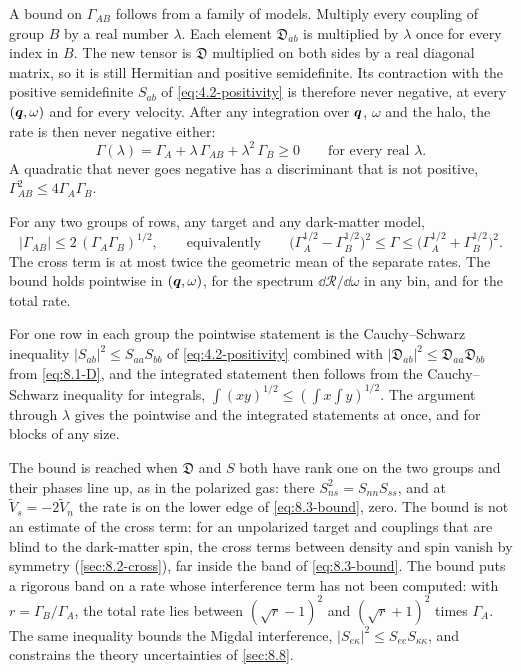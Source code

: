 A bound on $\varGamma_{AB}$ follows from a family of models. Multiply every coupling of group $B$ by a real number $\lambda$. Each element $\mathfrak{D}_{ab}$ is multiplied by $\lambda$ once for every index in $B$. The new tensor is $\mathfrak{D}$ multiplied on both sides by a real diagonal matrix, so it is still Hermitian and positive semidefinite. Its contraction with the positive semidefinite $S_{ab}$ of \cref{eq:4.2-positivity} is therefore never negative, at every $(\bm{q},\omega)$ and for every velocity. After any integration over $\bm{q}$, $\omega$ and the halo, the rate is then never negative either:
\begin{equation*}
  \varGamma(\lambda) = \varGamma_A + \lambda\,\varGamma_{AB} + \lambda^2\,\varGamma_B \ge 0 \qquad \text{for every real } \lambda .
\end{equation*}
A quadratic that never goes negative has a discriminant that is not positive, $\varGamma_{AB}^2 \le 4\varGamma_A\varGamma_B$.
\begin{keyresult}
For any two groups of rows, any target and any dark-matter model,
\begin{equation}
  |\varGamma_{AB}| \le 2\,(\varGamma_A\varGamma_B)^{1/2} , \qquad\text{equivalently}\qquad
  \bigl(\varGamma_A^{1/2} - \varGamma_B^{1/2}\bigr)^2 \le \varGamma \le \bigl(\varGamma_A^{1/2} + \varGamma_B^{1/2}\bigr)^2 .
  \label{eq:8.3-bound}
\end{equation}
The cross term is at most twice the geometric mean of the separate rates. The bound holds pointwise in $(\bm{q},\omega)$, for the spectrum $\dd\mathcal{R}/\dd\omega$ in any bin, and for the total rate.
\end{keyresult}
\noindent For one row in each group the pointwise statement is the Cauchy--Schwarz inequality $|S_{ab}|^2 \le S_{aa}S_{bb}$ of \cref{eq:4.2-positivity} combined with $|\mathfrak{D}_{ab}|^2 \le \mathfrak{D}_{aa}\mathfrak{D}_{bb}$ from \cref{eq:8.1-D}, and the integrated statement then follows from the Cauchy--Schwarz inequality for integrals, $\int(xy)^{1/2} \le (\int x\int y)^{1/2}$. The argument through $\lambda$ gives the pointwise and the integrated statements at once, and for blocks of any size.

The bound is reached when $\mathfrak{D}$ and $S$ both have rank one on the two groups and their phases line up, as in the polarized gas: there $S_{ns}^2 = S_{nn}S_{ss}$, and at $\tilde V_s = -2\tilde V_n$ the rate is on the lower edge of \cref{eq:8.3-bound}, zero. The bound is not an estimate of the cross term: for an unpolarized target and couplings that are blind to the dark-matter spin, the cross terms between density and spin vanish by symmetry (\cref{sec:8.2-cross}), far inside the band of \cref{eq:8.3-bound}. The bound puts a rigorous band on a rate whose interference term has not been computed: with $r = \varGamma_B/\varGamma_A$, the total rate lies between $(\sqrt r - 1)^2$ and $(\sqrt r + 1)^2$ times $\varGamma_A$. The same inequality bounds the Migdal interference, $|S_{e\kappa}|^2 \le S_{ee}S_{\kappa\kappa}$, and constrains the theory uncertainties of \cref{sec:8.8}.

